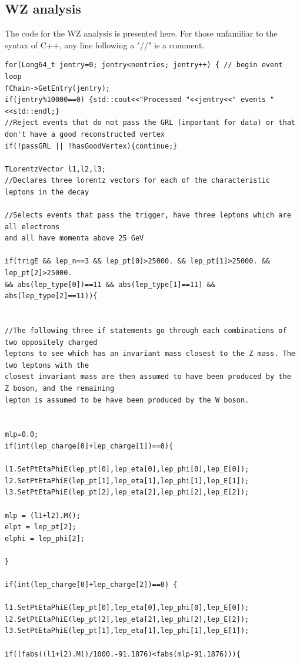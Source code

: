 \documentclass[runningheads,a4paper]{llncs}
\begin{document}
\subsection{WZ analysis}

\fontsize{7}{5}\selectfont
The code for the WZ analysis is presented here. For those unfamiliar to the syntax of C++, any line following a "//" is a comment.
\fontsize{7}{5}\selectfont
\begin{verbatim}
for(Long64_t jentry=0; jentry<nentries; jentry++) { // begin event loop
fChain->GetEntry(jentry);
if(jentry%10000==0) {std::cout<<"Processed "<<jentry<<" events "<<std::endl;}
//Reject events that do not pass the GRL (important for data) or that
don't have a good reconstructed vertex
if(!passGRL || !hasGoodVertex){continue;}
		
TLorentzVector l1,l2,l3; 
//Declares three lorentz vectors for each of the characteristic leptons in the decay

//Selects events that pass the trigger, have three leptons which are all electrons 
and all have momenta above 25 GeV 

if(trigE && lep_n==3 && lep_pt[0]>25000. && lep_pt[1]>25000. && lep_pt[2]>25000. 
&& abs(lep_type[0])==11 && abs(lep_type[1]==11) && abs(lep_type[2]==11)){
		        

//The following three if statements go through each combinations of two oppositely charged 
leptons to see which has an invariant mass closest to the Z mass. The two leptons with the 
closest invariant mass are then assumed to have been produced by the 
Z boson, and the remaining
lepton is assumed to be have been produced by the W boson.
			
            
mlp=0.0; 
if(int(lep_charge[0]+lep_charge[1])==0){

l1.SetPtEtaPhiE(lep_pt[0],lep_eta[0],lep_phi[0],lep_E[0]);
l2.SetPtEtaPhiE(lep_pt[1],lep_eta[1],lep_phi[1],lep_E[1]);
l3.SetPtEtaPhiE(lep_pt[2],lep_eta[2],lep_phi[2],lep_E[2]);

mlp = (l1+l2).M();
elpt = lep_pt[2];
elphi = lep_phi[2];

}
                        
if(int(lep_charge[0]+lep_charge[2])==0) {
                                l1.SetPtEtaPhiE(lep_pt[0],lep_eta[0],lep_phi[0],lep_E[0]);
l2.SetPtEtaPhiE(lep_pt[2],lep_eta[2],lep_phi[2],lep_E[2]);
l3.SetPtEtaPhiE(lep_pt[1],lep_eta[1],lep_phi[1],lep_E[1]);

if((fabs((l1+l2).M()/1000.-91.1876)<fabs(mlp-91.1876))){


\end{verbatim}
\end{document}
